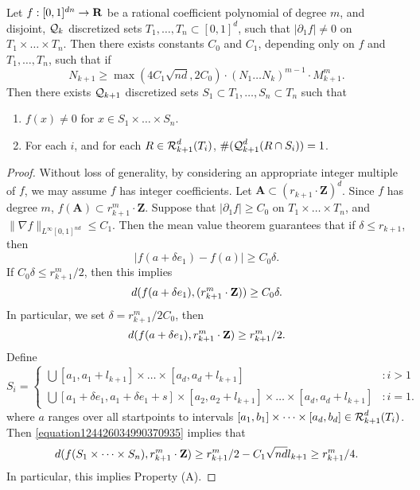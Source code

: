\begin{theorem}
    Let $f: [0,1]^{dn} \to \operatorname{\mathbf{R}}$ be a rational coefficient polynomial of degree $m$, and disjoint, $\operatorname{\mathcal{Q}}_k$ discretized sets $T_1, \dots, T_n \subset [0,1]^d$, such that $|\partial_1 f| \neq 0$ on $T_1 \times \dots \times T_n$. Then there exists constants $C_0$ and $C_1$, depending only on $f$ and $T_1, \dots, T_n$, such that if
    \begin{equation} \label{equation124426034990370935} N_{k+1} \geq \max(4C_1 \sqrt{nd}, 2C_0) \cdot (N_1 \dots N_k)^{m-1} \cdot M_{k+1}^m. \end{equation}
    Then there exists $\operatorname{\mathcal{Q}}_{k+1}$ discretized sets $S_1 \subset T_1, \dots, S_n \subset T_n$ such that
    \begin{enumerate}
        \item $f(x) \neq 0$ for $x \in S_1 \times \dots \times S_n$.
        \item For each $i$, and for each $R \in \operatorname{\mathcal{R}}_{k+1}^d(T_i)$, $\#(\operatorname{\mathcal{Q}}_{k+1}^d(R \cap S_i)) = 1$.
    \end{enumerate}
\end{theorem}
\begin{proof}
    Without loss of generality, by considering an appropriate integer multiple of $f$, we may assume $f$ has integer coefficients. Let $\mathbf{A} \subset (r_{k+1} \cdot \mathbf{Z})^d$. Since $f$ has degree $m$, $f(\mathbf{A}) \subset r_{k+1}^m \cdot \mathbf{Z}$. Suppose that $|\partial_1 f| \geq C_0$ on $T_1 \times \dots \times T_n$, and $\| \nabla f \|_{L^\infty[0,1]^{nd}} \leq C_1$. Then the mean value theorem guarantees that if $\delta \leq r_{k+1}$, then
    \[ |f(a + \delta e_1) - f(a)| \geq C_0 \delta. \]
    If $C_0 \delta \leq r_{k+1}^m/2$, then this implies
    \[ d(f(a + \delta e_1), (r_{k+1}^m \cdot \operatorname{\mathbf{Z}})) \geq C_0 \delta. \]
    In particular, we set $\delta = r_{k+1}^m/2C_0$, then
    \[ d(f(a + \delta e_1), r_{k+1}^m \cdot \operatorname{\mathbf{Z}}) \geq r_{k+1}^m/2. \]
    Define
    \[ S_i = \begin{cases} \bigcup [a_1, a_1 + l_{k+1}] \times \dots \times [a_d, a_d + l_{k+1}] &: i > 1 \\ \bigcup [a_1 + \delta e_1, a_1 + \delta e_1 + s] \times [a_2, a_2 + l_{k+1}] \times \dots \times [a_d, a_d + l_{k+1}] &: i = 1. \end{cases} \]
    where $a$ ranges over all startpoints to intervals $[a_1,b_1] \times \dots \times [a_d,b_d] \in \operatorname{\mathcal{R}}_{k+1}^d(T_i)$. Then \eqref{equation124426034990370935} implies that
    \[ d(f(S_1 \times \dots \times S_n), r_{k+1}^m \cdot \operatorname{\mathbf{Z}}) \geq r_{k+1}^m/2 - C_1 \sqrt{nd} l_{k+1} \geq r_{k+1}^m/4. \]
    In particular, this implies Property (A).
\end{proof}

